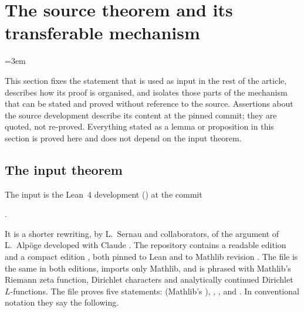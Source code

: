 \section{The source theorem and its transferable mechanism}\label{sec:src}

\providecommand{\srcrem}{\mathrm{rem}}
\providecommand{\srcB}{\mathcal{B}}
\providecommand{\srcT}{\mathcal{T}}
\providecommand{\srcRR}{\mathcal{R}}
\providecommand{\srctr}{\mathsf{T}}
\begingroup\emergencystretch=3em

This section fixes the statement that is used as input in the rest of the article, describes
how its proof is organised, and isolates those parts of the mechanism that can be stated and
proved without reference to the source. Assertions about the source development describe its
content at the pinned commit; they are quoted, not re-proved. Everything stated as a lemma or
proposition in this section is proved here and does not depend on the input theorem.

\subsection{The input theorem}\label{src:sec:input}
\begingroup\raggedright
{}
\endgroup

The input is the Lean~4 development \repo{} () \cite{Sernau2026GRH} at
the commit
\begin{center}
.
\end{center}
It is a shorter
rewriting, by L.~Sernau and collaborators, of the argument of L.~Alp\"oge developed with
Claude \cite{Alpoge2026Remark}. The repository contains a readable edition  and a
compact edition , both pinned to Lean  and to Mathlib revision
. The file  is the same
in both editions, imports only Mathlib, and is phrased with Mathlib's Riemann zeta function,
Dirichlet characters and analytically continued Dirichlet $L$-functions. The file
 proves five statements:  (Mathlib's
), ,
,  and
. In conventional notation they say the following.

